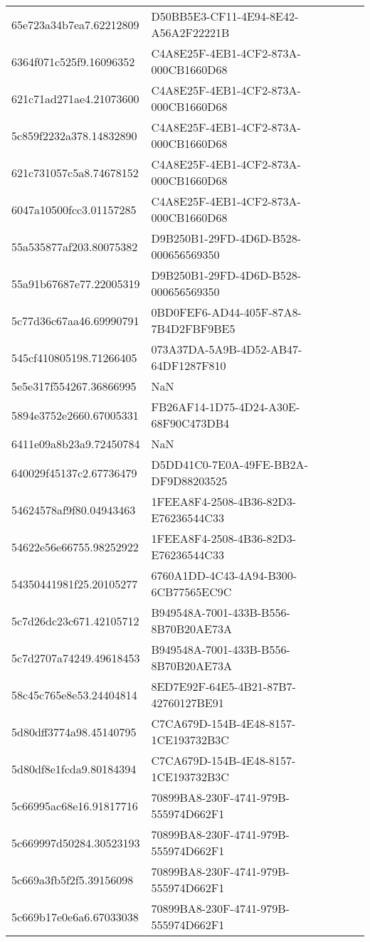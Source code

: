 \begin{tabular}{ll}
65e723a34b7ea7.62212809 & D50BB5E3-CF11-4E94-8E42-A56A2F22221B \\
6364f071c525f9.16096352 & C4A8E25F-4EB1-4CF2-873A-000CB1660D68 \\
621c71ad271ae4.21073600 & C4A8E25F-4EB1-4CF2-873A-000CB1660D68 \\
5c859f2232a378.14832890 & C4A8E25F-4EB1-4CF2-873A-000CB1660D68 \\
621c731057c5a8.74678152 & C4A8E25F-4EB1-4CF2-873A-000CB1660D68 \\
6047a10500fcc3.01157285 & C4A8E25F-4EB1-4CF2-873A-000CB1660D68 \\
55a535877af203.80075382 & D9B250B1-29FD-4D6D-B528-000656569350 \\
55a91b67687e77.22005319 & D9B250B1-29FD-4D6D-B528-000656569350 \\
5c77d36c67aa46.69990791 & 0BD0FEF6-AD44-405F-87A8-7B4D2FBF9BE5 \\
545cf410805198.71266405 & 073A37DA-5A9B-4D52-AB47-64DF1287F810 \\
5e5e317f554267.36866995 & NaN \\
5894e3752e2660.67005331 & FB26AF14-1D75-4D24-A30E-68F90C473DB4 \\
6411e09a8b23a9.72450784 & NaN \\
640029f45137c2.67736479 & D5DD41C0-7E0A-49FE-BB2A-DF9D88203525 \\
54624578af9f80.04943463 & 1FEEA8F4-2508-4B36-82D3-E76236544C33 \\
54622e56e66755.98252922 & 1FEEA8F4-2508-4B36-82D3-E76236544C33 \\
54350441981f25.20105277 & 6760A1DD-4C43-4A94-B300-6CB77565EC9C \\
5c7d26dc23c671.42105712 & B949548A-7001-433B-B556-8B70B20AE73A \\
5c7d2707a74249.49618453 & B949548A-7001-433B-B556-8B70B20AE73A \\
58c45c765e8e53.24404814 & 8ED7E92F-64E5-4B21-87B7-42760127BE91 \\
5d80dff3774a98.45140795 & C7CA679D-154B-4E48-8157-1CE193732B3C \\
5d80df8e1fcda9.80184394 & C7CA679D-154B-4E48-8157-1CE193732B3C \\
5c66995ac68e16.91817716 & 70899BA8-230F-4741-979B-555974D662F1 \\
5c669997d50284.30523193 & 70899BA8-230F-4741-979B-555974D662F1 \\
5c669a3fb5f2f5.39156098 & 70899BA8-230F-4741-979B-555974D662F1 \\
5c669b17e0e6a6.67033038 & 70899BA8-230F-4741-979B-555974D662F1 \\

\end{tabular}
